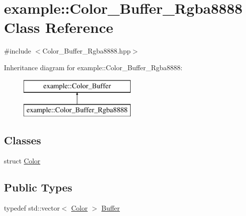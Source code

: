 \hypertarget{classexample_1_1_color___buffer___rgba8888}{}\section{example\+:\+:Color\+\_\+\+Buffer\+\_\+\+Rgba8888 Class Reference}
\label{classexample_1_1_color___buffer___rgba8888}


{\ttfamily \#include $<$Color\+\_\+\+Buffer\+\_\+\+Rgba8888.\+hpp$>$}

Inheritance diagram for example\+:\+:Color\+\_\+\+Buffer\+\_\+\+Rgba8888\+:\begin{figure}[H]
\begin{center}
\leavevmode
\includegraphics[height=2.000000cm]{classexample_1_1_color___buffer___rgba8888}
\end{center}
\end{figure}
\subsection*{Classes}
\begin{DoxyCompactItemize}
\item 
struct \mbox{\hyperlink{structexample_1_1_color___buffer___rgba8888_1_1_color}{Color}}
\end{DoxyCompactItemize}
\subsection*{Public Types}
\begin{DoxyCompactItemize}
\item 
typedef std\+::vector$<$ \mbox{\hyperlink{structexample_1_1_color___buffer___rgba8888_1_1_color}{Color}} $>$ \mbox{\hyperlink{classexample_1_1_color___buffer___rgba8888_ac6bfcddbbeeb02961b8724d9f5e10033}{Buffer}}
\end{DoxyCompactItemize}
